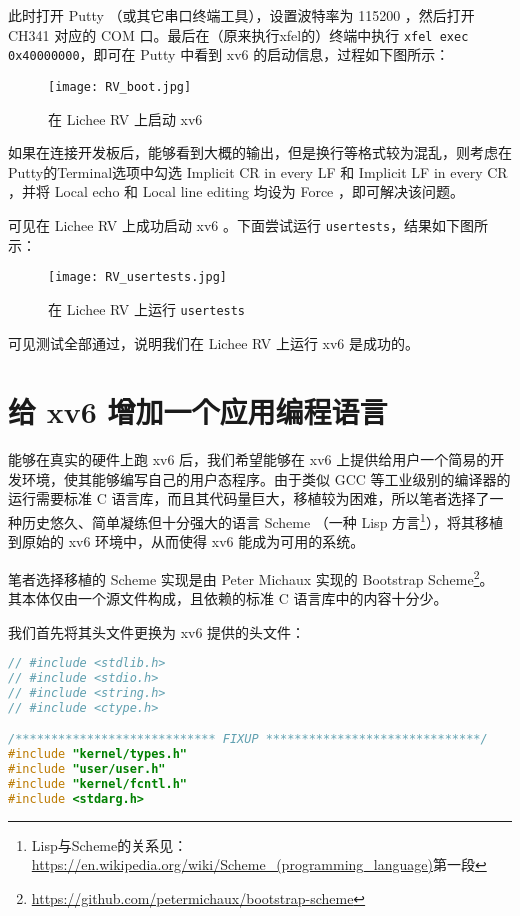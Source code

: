 此时打开 Putty （或其它串口终端工具），设置波特率为 115200 ，然后打开 CH341 对应的 COM 口。最后在（原来执行xfel的）终端中执行 \lstinline{xfel exec 0x40000000}，即可在 Putty 中看到 xv6 的启动信息，过程如下图所示：

\begin{figure}[H]
    \centering
    \texttt{[image: RV\_boot.jpg]}
    \caption{ 在 Lichee RV 上启动 xv6}
\end{figure}

\begin{theorem}[Putty串口终端换行不正确]
    如果在连接开发板后，能够看到大概的输出，但是换行等格式较为混乱，则考虑在Putty的Terminal选项中勾选 Implicit CR in every LF 和 Implicit LF in every CR ，并将 Local echo 和 Local line editing 均设为 Force ，即可解决该问题。
\end{theorem}

可见在 Lichee RV 上成功启动 xv6 。下面尝试运行 \lstinline{usertests}，结果如下图所示：

\begin{figure}[H]
    \centering
    \texttt{[image: RV\_usertests.jpg]}
    \caption{ 在 Lichee RV 上运行 \lstinline{usertests}}
\end{figure}

可见测试全部通过，说明我们在 Lichee RV 上运行 xv6 是成功的。

\section{给 xv6 增加一个应用编程语言}

能够在真实的硬件上跑 xv6 后，我们希望能够在 xv6 上提供给用户一个简易的开发环境，使其能够编写自己的用户态程序。由于类似 GCC 等工业级别的编译器的运行需要标准 C 语言库，而且其代码量巨大，移植较为困难，所以笔者选择了一种历史悠久、简单凝练但十分强大的语言 Scheme （一种 Lisp 方言\footnote{Lisp与Scheme的关系见：\url{https://en.wikipedia.org/wiki/Scheme_(programming_language)}第一段}），将其移植到原始的 xv6 环境中，从而使得 xv6 能成为可用的系统。

笔者选择移植的 Scheme 实现是由 Peter Michaux 实现的 Bootstrap Scheme\footnote{\url{https://github.com/petermichaux/bootstrap-scheme}}。 其本体仅由一个源文件构成，且依赖的标准 C 语言库中的内容十分少。

我们首先将其头文件更换为 xv6 提供的头文件：

\begin{lstlisting}[language=C]
// #include <stdlib.h>
// #include <stdio.h>
// #include <string.h>
// #include <ctype.h>

/**************************** FIXUP ******************************/
#include "kernel/types.h"
#include "user/user.h"
#include "kernel/fcntl.h"
#include <stdarg.h>
\end{lstlisting}

